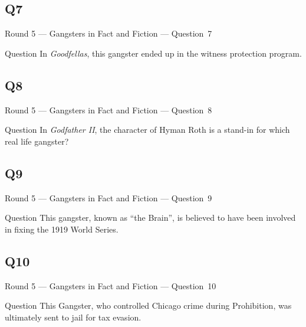 \documentclass[11pt]{beamer}
\begin{document}
\subsection*{Q7}
\begin{frame}[t]{Round 5 --- Gangsters in Fact and Fiction --- \mbox{Question 7}}
\begin{block}{Question}
In \emph{Goodfellas}, this gangster ended up in the witness protection program.
\end{block}
\end{frame}
\subsection*{Q8}
\begin{frame}[t]{Round 5 --- Gangsters in Fact and Fiction --- \mbox{Question 8}}
\begin{block}{Question}
In \emph{Godfather II}, the character of Hyman Roth is a stand-in for which real life gangster? 
\end{block}
\end{frame}
\subsection*{Q9}
\begin{frame}[t]{Round 5 --- Gangsters in Fact and Fiction --- \mbox{Question 9}}
\begin{block}{Question}
This gangster, known as ``the Brain'', is believed to have been involved in fixing the 1919 World Series.
\end{block}
\end{frame}
\subsection*{Q10}
\begin{frame}[t]{Round 5 --- Gangsters in Fact and Fiction --- \mbox{Question 10}}
\begin{block}{Question}
This Gangster, who controlled Chicago crime during Prohibition, was ultimately sent to jail for tax evasion.
\end{block}
\end{frame}
\end{document}
